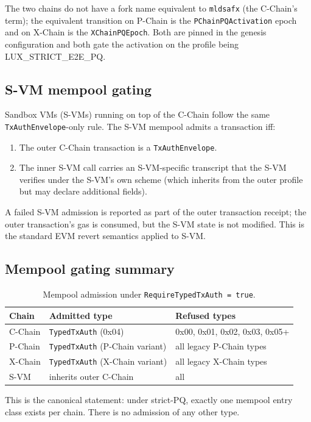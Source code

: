 The two chains do not have a fork name equivalent to \texttt{mldsafx} (the
C-Chain's term); the equivalent transition on P-Chain is the
\texttt{PChainPQActivation} epoch and on X-Chain is the
\texttt{XChainPQEpoch}. Both are pinned in the genesis configuration and
both gate the activation on the profile being LUX\_STRICT\_E2E\_PQ.

\subsection{S-VM mempool gating}

Sandbox VMs (S-VMs) running on top of the C-Chain follow the same
\texttt{TxAuthEnvelope}-only rule. The S-VM mempool admits a transaction
iff:

\begin{enumerate}[leftmargin=2em,nosep]
  \item The outer C-Chain transaction is a \texttt{TxAuthEnvelope}.
  \item The inner S-VM call carries an S-VM-specific transcript that the
    S-VM verifies under the S-VM's own scheme (which inherits from the
    outer profile but may declare additional fields).
\end{enumerate}

A failed S-VM admission is reported as part of the outer transaction
receipt; the outer transaction's gas is consumed, but the S-VM state is
not modified. This is the standard EVM revert semantics applied to S-VM.

\subsection{Mempool gating summary}

\begin{table}[H]
\centering
\caption{Mempool admission under \texttt{RequireTypedTxAuth = true}.}
\label{tab:mempool-gate}
\begin{tabular}{lll}
\toprule
Chain & Admitted type & Refused types \\
\midrule
C-Chain & \texttt{TypedTxAuth} (0x04)             & 0x00, 0x01, 0x02, 0x03, 0x05+ \\
P-Chain & \texttt{TypedTxAuth} (P-Chain variant)   & all legacy P-Chain types \\
X-Chain & \texttt{TypedTxAuth} (X-Chain variant)   & all legacy X-Chain types \\
S-VM    & inherits outer C-Chain                  & all \\
\bottomrule
\end{tabular}
\end{table}

This is the canonical statement: under strict-PQ, exactly one mempool entry
class exists per chain. There is no admission of any other type.
